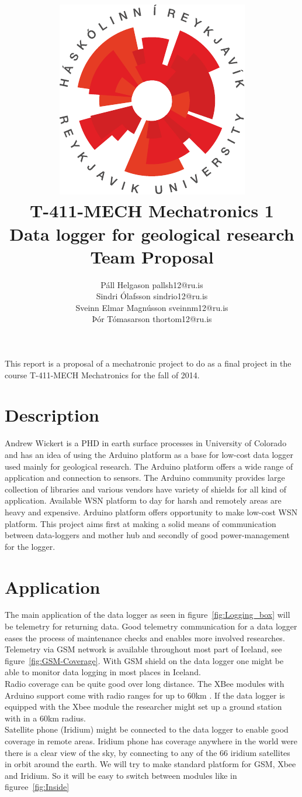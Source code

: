 \documentclass[12pt,a4paper,titlepage]{article}
\author{Páll Helgason pallsh12@ru.is\\Sindri Ólafsson sindrio12@ru.is\\Sveinn Elmar Magnússon sveinnm12@ru.is\\Þór Tómasarson thortom12@ru.is}  %
\title{\includegraphics{graphics/ru-logo}\\\vspace{10mm}
T-411-MECH Mechatronics 1\\Data logger for geological research\\Team Proposal}  %
\begin{document}
\maketitle  %
\onehalfspacing %

This report is a proposal of a mechatronic project to do as a
final project in the course T-411-MECH Mechatronics for the fall of 2014.
 

\section{Description}
Andrew Wickert is a PHD in earth surface processes in University of Colorado and has an 
idea of using the Arduino platform as a base for low-cost data logger used mainly
for geological research. The Arduino platform offers a wide range of application and connection to 
sensors. The Arduino community provides large collection of libraries and various vendors have 
variety of shields for all kind of application. 
Available WSN platform \cite{WSN} to day for harsh and remotely areas are heavy and expensive.
Arduino platform offers opportunity to make low-cost WSN platform.
This project aims first at making a solid means of communication between data-loggers and mother hub
and secondly of good power-management for the logger. 


\section{Application}

The main application of the data logger as seen in figure~\ref{fig:Logging_box} will be telemetry for returning data. Good telemetry communication for a data logger eases the process of maintenance checks and enables more involved researches.\\
Telemetry via GSM network is available throughout most part of Iceland, see figure~\ref{fig:GSM-Coverage}. With GSM shield on the data logger one might be able to monitor data logging in most places in Iceland.\\
Radio coverage can be quite good over long distance. The XBee modules with Arduino support come with radio ranges for up to 60km \cite{Xbee}. If the data logger is equipped with the Xbee module the researcher might set up a ground station with in a 60km radius.\\
Satellite phone (Iridium) might be connected to the data logger to enable good coverage in remote areas. Iridium phone has coverage anywhere in the world were there is a clear view of the sky, by connecting to any of the 66 iridium satellites in orbit around the earth\cite{iridium}. We will try to make standard platform for GSM, Xbee and Iridium. So it will be easy to switch between modules like in figuree~\ref*{fig:Inside} 
\end{document}
